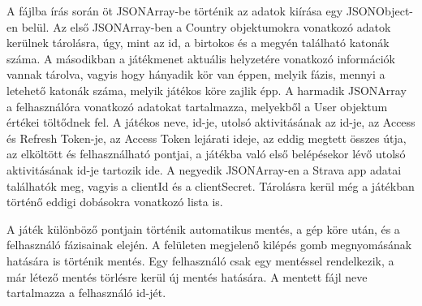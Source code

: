 A fájlba írás során öt JSONArray-be történik az adatok kiírása egy JSONObject-en belül. Az első JSONArray-ben a Country objektumokra vonatkozó adatok kerülnek tárolásra, úgy, mint az id, a birtokos és a megyén található katonák száma. A másodikban a játékmenet aktuális helyzetére vonatkozó információk vannak tárolva, vagyis hogy hányadik kör van éppen, melyik fázis, mennyi a letehető katonák száma, melyik játékos köre zajlik épp. A harmadik JSONArray a felhasználóra vonatkozó adatokat tartalmazza, melyekből a User objektum értékei töltődnek fel. A játékos neve, id-je, utolsó aktivitásának az id-je, az Access és Refresh Token-je, az Access Token lejárati ideje, az eddig megtett összes útja, az elköltött és felhasználható pontjai, a játékba való első belépésekor lévő utolsó aktivitásának id-je tartozik ide. A negyedik JSONArray-en a Strava app adatai találhatók meg, vagyis a clientId és a clientSecret. Tárolásra kerül még a játékban történő eddigi dobásokra vonatkozó lista is. 

A játék különböző pontjain történik automatikus mentés, a gép köre után, és a felhasználó fázisainak elején. A felületen megjelenő kilépés gomb megnyomásának hatására is történik mentés. Egy felhasználó csak egy mentéssel rendelkezik, a már létező mentés törlésre kerül új mentés hatására. A mentett fájl neve tartalmazza a felhasználó id-jét. 